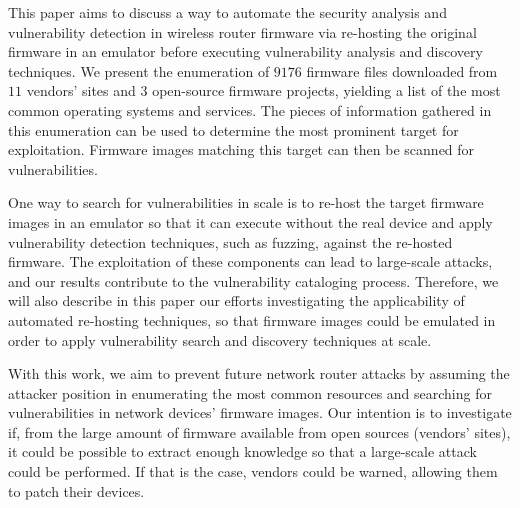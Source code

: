 This paper aims to discuss a way to automate the security analysis and vulnerability detection in wireless router firmware via re-hosting the original firmware in an emulator before executing vulnerability analysis and discovery techniques. We present the enumeration of $9176$ firmware files downloaded from $11$ vendors' sites and $3$ open-source firmware projects, yielding a list of the most common operating systems and services. The pieces of information gathered in this enumeration can be used to determine the most prominent target for exploitation. Firmware images matching this target can then be scanned for vulnerabilities. 

One way to search for vulnerabilities in scale is to re-host the target firmware images in an emulator so that it can execute without the real device and apply vulnerability detection techniques, such as fuzzing, against the re-hosted firmware. The exploitation of these components can lead to large-scale attacks, and our results contribute to the vulnerability cataloging process. Therefore, we will also describe in this paper our efforts investigating the applicability of automated re-hosting techniques, so that firmware images could be emulated in order to apply vulnerability search and discovery techniques at scale.

With this work, we aim to prevent future network router attacks by assuming the attacker position in enumerating the most common resources and searching for vulnerabilities in network devices' firmware images. Our intention is to investigate if, from the large amount of firmware available from open sources (vendors' sites), it could be possible to extract enough knowledge so that a large-scale attack could be performed. If that is the case, vendors could be warned, allowing them to patch their devices.



